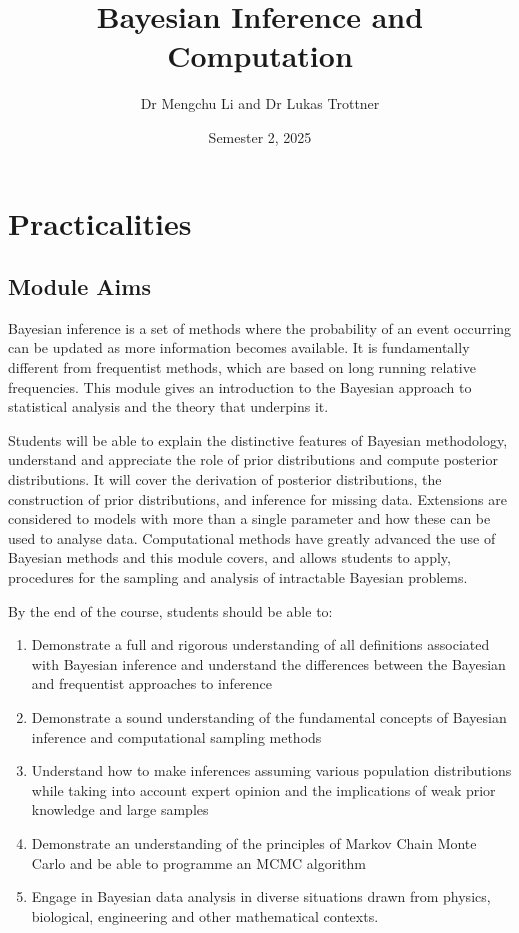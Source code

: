\documentclass[
]{book}
\title{Bayesian Inference and Computation}
\author{Dr Mengchu Li and Dr Lukas Trottner}
\date{Semester 2, 2025}
\providecommand{\tightlist}{%
  \setlength{\itemsep}{0pt}\setlength{\parskip}{0pt}}
\begin{document}
\maketitle

{
\setcounter{tocdepth}{1}
\tableofcontents
}
\hypertarget{practicalities}{%
\chapter*{Practicalities}\label{practicalities}}

\hypertarget{module-aims}{%
\section{Module Aims}\label{module-aims}}

Bayesian inference is a set of methods where the probability of an event
occurring can be updated as more information becomes available. It is
fundamentally different from frequentist methods, which are based on
long running relative frequencies. This module gives an introduction to
the Bayesian approach to statistical analysis and the theory that
underpins it.

Students will be able to explain the distinctive features of Bayesian
methodology, understand and appreciate the role of prior distributions
and compute posterior distributions. It will cover the derivation of
posterior distributions, the construction of prior distributions, and
inference for missing data. Extensions are considered to models with
more than a single parameter and how these can be used to analyse data.
Computational methods have greatly advanced the use of Bayesian methods
and this module covers, and allows students to apply, procedures for the
sampling and analysis of intractable Bayesian problems.

By the end of the course, students should be able to:

\begin{enumerate}
\def\labelenumi{\arabic{enumi}.}
\tightlist
\item
  Demonstrate a full and rigorous understanding of all definitions
  associated with Bayesian inference and understand the differences
  between the Bayesian and frequentist approaches to inference
\item
  Demonstrate a sound understanding of the fundamental concepts of
  Bayesian inference and computational sampling methods
\item
  Understand how to make inferences assuming various population
  distributions while taking into account expert opinion and the
  implications of weak prior knowledge and large samples
\item
  Demonstrate an understanding of the principles of Markov Chain Monte
  Carlo and be able to programme an MCMC algorithm
\item
  Engage in Bayesian data analysis in diverse situations drawn from
  physics, biological, engineering and other mathematical contexts.
\end{enumerate}
\end{document}
